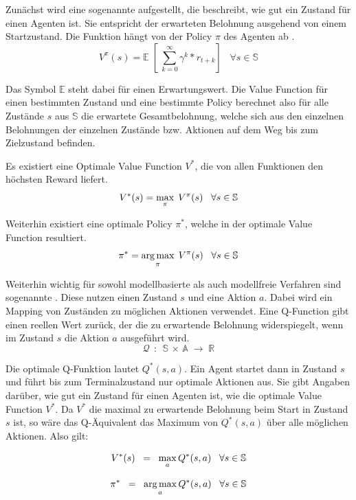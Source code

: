 Zunächst wird eine sogenannte  aufgestellt, die beschreibt, wie gut ein Zustand für einen Agenten ist. Sie entspricht der erwarteten Belohnung ausgehend von einem Startzustand. Die Funktion hängt von der Policy $\pi$ des Agenten ab \cite{alzantot} \cite{intro_to_ml_book}.
$$    V^{\pi}(s)  =   \mathbb{E} \; [  \:  \sum_{k=0}^{\infty} {\gamma^k * r_{t+k}} ]   \;\;\;   \forall{s} 	\in{ \mathbb{S} }     $$

Das Symbol $\mathbb{E}$ steht dabei für einen Erwartungswert. Die Value Function für einen bestimmten Zustand und eine bestimmte Policy berechnet also für alle Zustände $s$ aus $\mathbb{S}$ die erwartete Gesamtbelohnung, welche sich aus den einzelnen Belohnungen der einzelnen Zustände bzw. Aktionen auf dem Weg bis zum Zielzustand befinden.

Es existiert eine Optimale Value Function $V^*$, die von allen Funktionen den höchsten Reward liefert.
$$   V^*(s)   =   \operatorname*{max}_{\pi} \; V^{\pi}(s)    \;\;\;   \forall{s} 	\in{ \mathbb{S} }     $$


Weiterhin existiert eine optimale Policy ${\pi}^*$, welche in der optimale Value Function resultiert.
$$   {\pi}^*   =  \operatorname*{arg\,max}_{\pi}  \; V^{\pi}(s)    \;\;\;   \forall{s} 	\in{ \mathbb{S} }     $$



Weiterhin wichtig für sowohl modellbasierte als auch modellfreie Verfahren sind sogenannte . Diese nutzen einen Zustand $s$ und eine Aktion $a$. Dabei wird ein Mapping von Zuständen zu möglichen Aktionen verwendet. Eine Q-Function gibt einen reellen Wert zurück, der die zu erwartende Belohnung widerspiegelt, wenn im Zustand $s$ die Aktion $a$ ausgeführt wird.
$$  \mathcal{Q}  \;\,  :  \;\,  \mathbb{S} \, \times   \, \mathbb{A}  \;  \rightarrow  \;  \mathbb{R}  $$

Die optimale Q-Funktion lautet $Q^*(s,a)$. Ein Agent startet dann in Zustand $s$ und führt bis zum Terminalzustand nur optimale Aktionen aus. Sie gibt Angaben darüber, wie gut ein Zustand für einen Agenten ist, wie die optimale Value Function $V^*$. Da $V^*$ die maximal zu erwartende Belohnung beim Start in Zustand $s$ ist, so wäre das Q-Äquivalent das Maximum von $Q^*(s,a)$ über alle möglichen Aktionen. Also gilt:

$$   V^*(s)   \;\; = \;\;   \operatorname*{max}_a Q^* (s,a)  \;\;\;   \forall{s} 	\in{ \mathbb{S} }   $$

$$   {\pi}^*   \;\; = \;\;   \operatorname*{arg\,max}_a Q^* (s,a)  \;\;\;   \forall{s} 	\in{ \mathbb{S} }   $$



